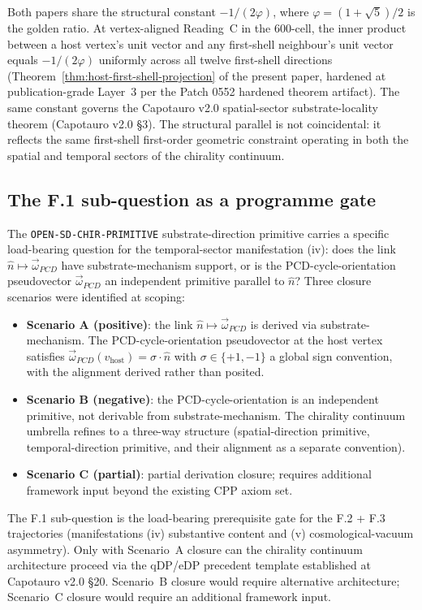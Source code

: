 \documentclass[11pt,letterpaper]{article}
\newcommand{\phig}{\varphi}
\newcommand{\vhost}{v_{\text{host}}}
\newcommand{\omegaPCD}{\vec{\omega}_{PCD}}
\begin{document}
Both papers share the structural constant $-1/(2\phig)$, where $\phig = (1 + \sqrt{5})/2$ is the golden ratio. At vertex-aligned Reading~C in the 600-cell, the inner product between a host vertex's unit vector and any first-shell neighbour's unit vector equals $-1/(2\phig)$ uniformly across all twelve first-shell directions (Theorem~\ref{thm:host-first-shell-projection} of the present paper, hardened at publication-grade Layer~3 per the Patch 0552 hardened theorem artifact). The same constant governs the Capotauro v2.0 spatial-sector substrate-locality theorem (Capotauro v2.0 \S3). The structural parallel is not coincidental: it reflects the same first-shell first-order geometric constraint operating in both the spatial and temporal sectors of the chirality continuum.

\subsection{The F.1 sub-question as a programme gate}
\label{sec:f1-as-programme-gate}

The \texttt{OPEN-SD-CHIR-PRIMITIVE} substrate-direction primitive carries a specific load-bearing question for the temporal-sector manifestation (iv): does the link $\hat{n} \mapsto \omegaPCD$ have substrate-mechanism support, or is the PCD-cycle-orientation pseudovector $\omegaPCD$ an independent primitive parallel to $\hat{n}$? Three closure scenarios were identified at scoping:
\begin{itemize}[leftmargin=2em]
\item \textbf{Scenario A (positive)}: the link $\hat{n} \mapsto \omegaPCD$ is derived via substrate-mechanism. The PCD-cycle-orientation pseudovector at the host vertex satisfies $\omegaPCD(\vhost) = \sigma \cdot \hat{n}$ with $\sigma \in \{+1, -1\}$ a global sign convention, with the alignment derived rather than posited.
\item \textbf{Scenario B (negative)}: the PCD-cycle-orientation is an independent primitive, not derivable from substrate-mechanism. The chirality continuum umbrella refines to a three-way structure (spatial-direction primitive, temporal-direction primitive, and their alignment as a separate convention).
\item \textbf{Scenario C (partial)}: partial derivation closure; requires additional framework input beyond the existing CPP axiom set.
\end{itemize}

The F.1 sub-question is the load-bearing prerequisite gate for the F.2 + F.3 trajectories (manifestations (iv) substantive content and (v) cosmological-vacuum asymmetry). Only with Scenario~A closure can the chirality continuum architecture proceed via the qDP/eDP precedent template established at Capotauro v2.0 \S20. Scenario~B closure would require alternative architecture; Scenario~C closure would require an additional framework input.
\end{document}
